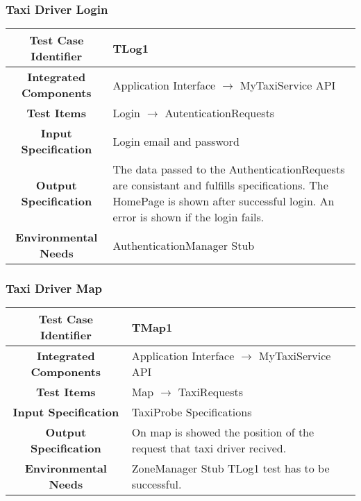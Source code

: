 \documentclass[11pt, a4paper,titlepage]{article}
\begin{document}
	\subsubsection{Taxi Driver Login}
	\begin{tabularx}{\textwidth}{| c|X|}
		\hline \textbf{Test Case Identifier} & \label{TLog1}TLog1 \\
		\hline \textbf{Integrated Components} & Application Interface $\rightarrow $ MyTaxiService API \\
		\hline \textbf{Test Items} & Login $\rightarrow $ AutenticationRequests \\
		\hline \textbf{Input Specification} & Login email and password \\
		\hline \textbf{Output Specification} & 
		The data passed to the AuthenticationRequests are consistant and fulfills specifications.\newline
		The HomePage is shown after successful login.\newline
		An error is shown if the login fails.  \\
		\hline \textbf{Environmental Needs} & AuthenticationManager Stub\\
		\hline
	\end{tabularx}
	\newline
	\newline
	\subsubsection{Taxi Driver Map}
	\begin{tabularx}{\textwidth}{| c|X|}
		\hline \textbf{Test Case Identifier} & \label{TMap1}TMap1 \\
		\hline \textbf{Integrated Components} & Application Interface $\rightarrow $ MyTaxiService API \\
		\hline \textbf{Test Items} & Map $\rightarrow $ TaxiRequests \\
		\hline \textbf{Input Specification} & TaxiProbe Specifications \\
		\hline \textbf{Output Specification} & On map is showed the position of the request that taxi driver recived. \\
		\hline \textbf{Environmental Needs} & ZoneManager Stub \newline TLog1 test has to be successful. \\
		\hline
	\end{tabularx}
	\newline
	\newline
\end{document}
